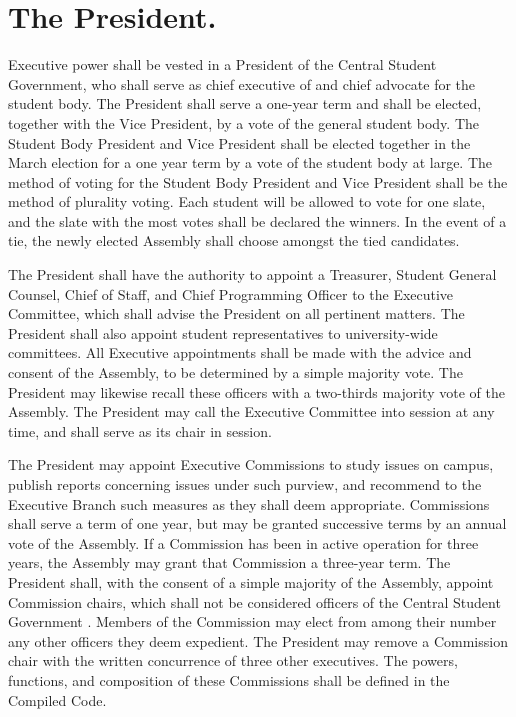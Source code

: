 \section{The President.}
    Executive power shall be vested in a President of the Central Student Government, who shall serve as chief executive of and chief advocate for the student body. The President shall serve a one-year term and shall be elected, together with the Vice President, by a vote of the general student body. The Student Body President and Vice President shall be elected together in the March election for a one year term by a vote of the student body at large.  The method of voting for the Student Body President and Vice President shall be the method of plurality voting.  Each student will be allowed to vote for one slate, and the slate with the most votes shall be declared the winners.  In the event of a tie, the newly elected Assembly shall choose amongst the tied candidates.

    The President shall have the authority to appoint a Treasurer, Student General Counsel, Chief of Staff, and Chief Programming Officer to the Executive Committee, which shall advise the President on all pertinent matters. The President shall also appoint student representatives to university-wide committees. All Executive appointments shall be made with the advice and consent of the Assembly, to be determined by a simple majority vote. The President may likewise recall these officers with a two-thirds majority vote of the Assembly. The President may call the Executive Committee into session at any time, and shall serve as its chair in session.

    The President may appoint Executive Commissions to study issues on campus, publish reports concerning issues under such purview, and recommend to the Executive Branch such measures as they shall deem appropriate. Commissions shall serve a term of one year, but may be granted successive terms by an annual vote of the Assembly. If a Commission has been in active operation for three years, the Assembly may grant that Commission a three-year term. The President shall, with the consent of a simple majority of the Assembly, appoint Commission chairs, which shall not be considered officers of the Central Student Government . Members of the Commission may elect from among their number any other officers they deem expedient. The President may remove a Commission chair with the written concurrence of three other executives. The powers, functions, and composition of these Commissions shall be defined in the Compiled Code.

